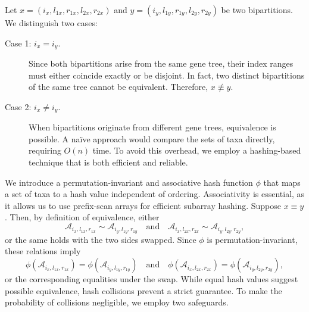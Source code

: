 \documentclass[10pt,a4paper]{article}
\begin{document}
Let $x = (i_x,l_{1x},r_{1x},l_{2x},r_{2x})$ and $y = (i_y,l_{1y},r_{1y},l_{2y},r_{2y})$ be two bipartitions. We distinguish two cases:
\begin{description}
    \item[Case 1: $i_x = i_y$.] Since both bipartitions arise from the same gene tree, their index ranges must either coincide exactly or be disjoint. In fact, two distinct bipartitions of the same tree cannot be equivalent. Therefore, $x \not\equiv y$.
    
    \item[Case 2: $i_x \neq i_y$.] When bipartitions originate from different gene trees, equivalence is possible. A naïve approach would compare the sets of taxa directly, requiring $O(n)$ time. To avoid this overhead, we employ a hashing-based technique that is both efficient and reliable.
\end{description}

We introduce a permutation-invariant and associative hash function $\phi$ that maps a set of taxa to a hash value independent of ordering. Associativity is essential, as it allows us to use prefix-scan arrays for efficient subarray hashing. Suppose $x \equiv y$. Then, by definition of equivalence, either 
\[
\mathcal{A}_{i_x,l_{1x},r_{1x}} \sim \mathcal{A}_{i_y,l_{1y},r_{1y}} \quad \text{and} \quad \mathcal{A}_{i_x,l_{2x},r_{2x}} \sim \mathcal{A}_{i_y,l_{2y},r_{2y}},
\]
or the same holds with the two sides swapped. Since $\phi$ is permutation-invariant, these relations imply
\[
\phi(\mathcal{A}_{i_x,l_{1x},r_{1x}}) = \phi(\mathcal{A}_{i_y,l_{1y},r_{1y}}) \quad \text{and} \quad \phi(\mathcal{A}_{i_x,l_{2x},r_{2x}}) = \phi(\mathcal{A}_{i_y,l_{2y},r_{2y}}),
\]
or the corresponding equalities under the swap. While equal hash values suggest possible equivalence, hash collisions prevent a strict guarantee. To make the probability of collisions negligible, we employ two safeguards.


\end{document}
